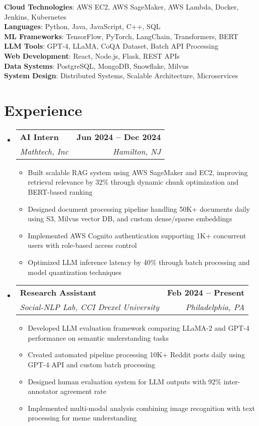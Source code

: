 \documentclass[letterpaper,11pt]{article}
\makeatletter
\newcommand{\resumeItem}[1]{
  \item\small{
    {#1 \vspace{-2pt}}
  }
}
\newcommand{\resumeSubheading}[4]{
  \vspace{-2pt}\item
    \begin{tabular*}{1.0\textwidth}[t]{l@{\extracolsep{\fill}}r}
      \textbf{#1} & \textbf{\small #2} \\
      \textit{\small#3} & \textit{\small #4} \\
    \end{tabular*}\vspace{-7pt}
}
\newcommand{\resumeSubHeadingListStart}{\begin{itemize}[leftmargin=0.0in, label={}]}
\newcommand{\resumeSubHeadingListEnd}{\end{itemize}}
\newcommand{\resumeItemListStart}{\begin{itemize}}
\newcommand{\resumeItemListEnd}{\end{itemize}\vspace{-5pt}}
\makeatother
\begin{document}
\begin{itemize}[leftmargin=0.15in, label={}]
	\small{\item{
		\textbf{Cloud Technologies}{: AWS EC2, AWS SageMaker, AWS Lambda, Docker, Jenkins, Kubernetes} \\
		\textbf{Languages}{: Python, Java, JavaScript, C++, SQL} \\
		\textbf{ML Frameworks}{: TensorFlow, PyTorch, LangChain, Transformers, BERT} \\
		\textbf{LLM Tools}{: GPT-4, LLaMA, CoQA Dataset, Batch API Processing} \\
		\textbf{Web Development}{: React, Node.js, Flask, REST APIs} \\
		\textbf{Data Systems}{: PostgreSQL, MongoDB, Snowflake, Milvus} \\
            \textbf{System Design}{: Distributed Systems, Scalable Architecture, Microservices}}
	}
\end{itemize}
\vspace{-15pt}

\section{Experience}
  \resumeSubHeadingListStart
    \resumeSubheading
    {AI Intern}{Jun 2024 -- Dec 2024}
    {Mathtech, Inc}{Hamilton, NJ}
    \resumeItemListStart
        \resumeItem{Built scalable RAG system using AWS SageMaker and EC2, improving retrieval relevance by 32\% through dynamic chunk optimization and BERT-based ranking}
        \resumeItem{Designed document processing pipeline handling 50K+ documents daily using S3, Milvus vector DB, and custom dense/sparse embeddings}
        \resumeItem{Implemented AWS Cognito authentication supporting 1K+ concurrent users with role-based access control}
        \resumeItem{Optimized LLM inference latency by 40\% through batch processing and model quantization techniques}
    \resumeItemListEnd
    
    \resumeSubheading
    {Research Assistant}{Feb 2024 -- Present}
    {Social-NLP Lab, CCI Drexel University}{Philadelphia, PA}
    \resumeItemListStart
        \resumeItem{Developed LLM evaluation framework comparing LLaMA-2 and GPT-4 performance on semantic understanding tasks}
        \resumeItem{Created automated pipeline processing 10K+ Reddit posts daily using GPT-4 API and custom batch processing}
        \resumeItem{Designed human evaluation system for LLM outputs with 92\% inter-annotator agreement rate}
        \resumeItem{Implemented multi-modal analysis combining image recognition with text processing for meme understanding}
    \resumeItemListEnd
\resumeSubHeadingListEnd
\vspace{-15pt}
\end{document}
